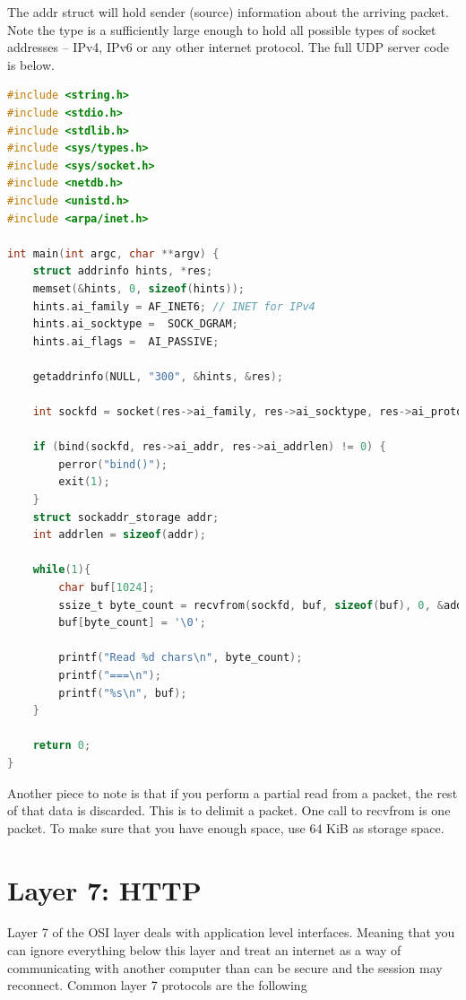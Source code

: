 The addr struct will hold sender (source) information about the arriving packet.
Note the  type is a sufficiently large enough to hold all possible types of socket addresses -- IPv4, IPv6 or any other internet protocol.
The full UDP server code is below.

\begin{lstlisting}[language=C]
#include <string.h>
#include <stdio.h>
#include <stdlib.h>
#include <sys/types.h>
#include <sys/socket.h>
#include <netdb.h>
#include <unistd.h>
#include <arpa/inet.h>

int main(int argc, char **argv) {
    struct addrinfo hints, *res;
    memset(&hints, 0, sizeof(hints));
    hints.ai_family = AF_INET6; // INET for IPv4
    hints.ai_socktype =  SOCK_DGRAM;
    hints.ai_flags =  AI_PASSIVE;

    getaddrinfo(NULL, "300", &hints, &res);

    int sockfd = socket(res->ai_family, res->ai_socktype, res->ai_protocol);

    if (bind(sockfd, res->ai_addr, res->ai_addrlen) != 0) {
        perror("bind()");
        exit(1);
    }
    struct sockaddr_storage addr;
    int addrlen = sizeof(addr);

    while(1){
        char buf[1024];
        ssize_t byte_count = recvfrom(sockfd, buf, sizeof(buf), 0, &addr, &addrlen);
        buf[byte_count] = '\0';

        printf("Read %d chars\n", byte_count);
        printf("===\n");
        printf("%s\n", buf);
    }

    return 0;
}
\end{lstlisting}

Another piece to note is that if you perform a partial read from a packet, the rest of that data is discarded.
This is to delimit a packet.
One call to recvfrom is one packet.
To make sure that you have enough space, use 64 KiB as storage space.

\section{Layer 7: HTTP}

Layer 7 of the OSI layer deals with application level interfaces.
Meaning that you can ignore everything below this layer and treat an internet as a way of communicating with another computer than can be secure and the session may reconnect.
Common layer 7 protocols are the following


